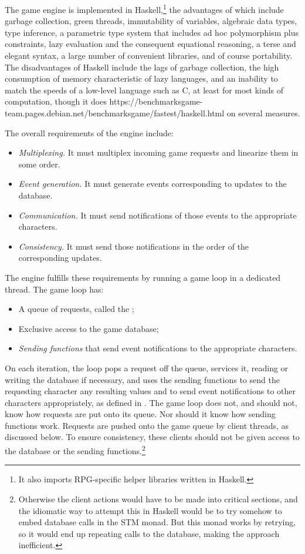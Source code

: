 The game engine is implemented in Haskell,\footnote{It also imports
RPG-specific helper libraries written in Haskell.} the advantages of
which include garbage collection, green threads, immutability of
variables, algebraic data types, type inference, a parametric type
system that includes ad hoc polymorphism plus constraints, lazy
evaluation and the consequent equational reasoning, a terse and
elegant syntax, a large number of convenient libraries, and of
course portability. The disadvantages of Haskell include the lags of
garbage collection, the high consumption of memory
characteristic of lazy languages, and an inability to match the speeds
of a low-level language such as C, at least for most kinds of
computation, though it does
{https://benchmarksgame-team.pages.debian.net/benchmarksgame/fastest/haskell.html}
on several measures.

The overall requirements of the engine include:
\begin{itemize}
    \item {\em Multiplexing.} It must multiplex incoming game requests and
    linearize them in some order.
    \item {\em Event generation.} It must generate events
    corresponding to updates to the database.
    \item {\em Communication.} It must send notifications of those events
    to the appropriate characters.
    \item {\em Consistency.} It must send those notifications in the
    order of the corresponding updates.
\end{itemize}
The engine fulfills these requirements by running a game loop in a dedicated
thread. The game loop has:
\begin{itemize}
    \item A queue of requests, called the ;
    \item Exclusive access to the game database;
    \item {\em Sending functions} that send event notifications to the
    appropriate characters.
\end{itemize}
On each iteration, the loop pops a request off the queue, services it,
reading or writing the database if necessary, and uses the sending
functions to send the requesting character any resulting values and to
send event notifications to other characters appropriately, as defined
in . The game loop does not, and should not,
know how requests are put onto its queue.  Nor should it know how
sending functions work. Requests are pushed onto the game queue by
client threads, as discussed below. To ensure consistency, these
clients should not be given access to the database or the
sending functions.\footnote{Otherwise the client actions would
have to be made into critical sections, and the idiomatic way to
attempt this in Haskell would be to try somehow to embed database
calls in the STM monad. But this monad works by retrying, so it would
end up repeating calls to the database, making the approach
inefficient.}

